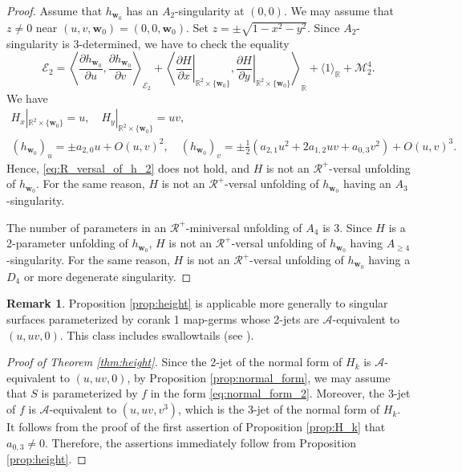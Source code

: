 \documentclass[12pt]{amsart}
\theoremstyle{plain}
\theoremstyle{definition}
\newtheorem{remark}[theorem]{Remark}
\newcommand{\R}{\mathbb{R}}
\renewcommand{\geq}{\geqslant}
\begin{document}
\begin{proof}
Assume that $h_{\bm{w}_0}$ has an $A_2$-singularity at $(0,0)$.
We may assume that $z\ne0$ near $(u,v,\bm{w}_0) = (0,0,\bm{w}_0)$.
Set $z = \pm\sqrt{1-x^2-y^2}$.
Since $A_2$-singularity is 3-determined, we have to check the equality
\begin{equation}
\label{eq:R_versal_of_h_2}
\mathcal{E}_2 = \left\langle\dfrac{\partial h_{\bm{w}_0}}{\partial u},\dfrac{\partial h_{\bm{w}_0}}{\partial v} \right\rangle_{\mathcal{E}_2} +\left\langle\left.\dfrac{\partial H}{\partial x}\right|_{\R^2\times\{\bm{w}_0\}}, \left.\dfrac{\partial H}{\partial y}\right|_{\R^2\times\{\bm{w}_0\}}\right\rangle_{\R} + \langle 1 \rangle_{\R} +\mathcal{M}_2^4.
\end{equation}
We have
\begin{gather*}
H_x|_{\R^2 \times \{\bm{w}_0\}} = u, \quad H_y|_{\R^2 \times \{\bm{w}_0\}} = u v,\\
(h_{\bm{w}_0})_u = \pm a_{2,0} u + O(u,v)^2,\quad (h_{\bm{w}_0})_v = \pm\frac12(a_{2,1}u^2 + 2a_{1,2}u v + a_{0,3}v^2)+ O(u,v)^3.
\end{gather*}
Hence, \eqref{eq:R_versal_of_h_2} does not hold, and $H$ is not an $\mathcal{R}^+$-versal unfolding of $h_{\bm{w}_0}$.
For the same reason, $H$ is not an $\mathcal{R}^+$-versal unfolding of $h_{\bm{w}_0}$ having an $A_3$-singularity.

The number of parameters in an $\mathcal{R}^+$-miniversal unfolding of $A_4$ is 3.
Since $H$ is a 2-parameter unfolding of $h_{\bm{w}_0}$, $H$ is not an $\mathcal{R}^+$-versal unfolding of $h_{\bm{w}_0}$ having $A_{\geq 4}$-singularity.
For the same reason, $H$ is not an $\mathcal{R}^+$-versal unfolding of
$h_{\bm{w}_0}$ having a $D_4$ or more degenerate singularity. 
\end{proof}

\begin{remark}
Proposition \ref{prop:height} is applicable more generally to singular surfaces parameterized by corank 1 map-germs whose 2-jets are $\mathcal{A}$-equivalent to $(u,uv,0)$. 
This class includes swallowtails (see \cite{Saji2018}).
\end{remark}

\begin{proof}[Proof of Theorem \ref{thm:height}]
Since the 2-jet of the normal form of $H_k$ is $\mathcal{A}$-equivalent to $(u,uv,0)$, by Proposition \ref{prop:normal_form}, we may assume that $S$ is parameterized by $f$ in the form \eqref{eq:normal_form_2}. 
Moreover, the $3$-jet of $f$ is $\mathcal{A}$-equivalent to $(u,uv,v^3)$, which is the 3-jet of the normal form of $H_k$. 
It follows from the proof of the first assertion of Proposition \ref{prop:H_k} that $a_{0,3}\ne0$.
Therefore, the assertions immediately follow from Proposition \ref{prop:height}. 
\end{proof}
\end{document}
